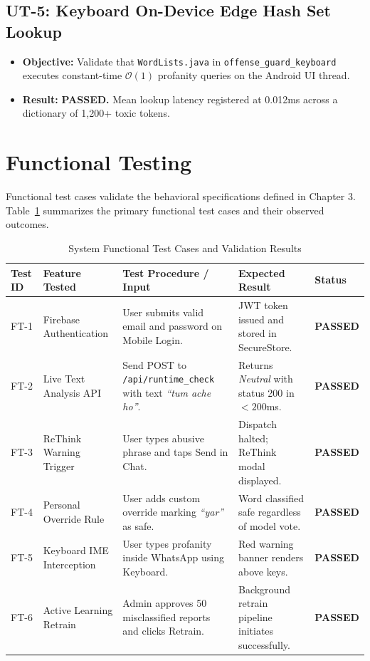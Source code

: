 \documentclass[A4paper,12pt]{report}
\theoremstyle{plain}
\theoremstyle{definition}
\theoremstyle{remark}
\numberwithin{equation}{section}
\begin{document}
\subsection{UT-5: Keyboard On-Device Edge Hash Set Lookup}
\begin{itemize}[leftmargin=*]
    \item \textbf{Objective:} Validate that \texttt{WordLists.java} in \texttt{offense\_guard\_keyboard} executes constant-time $\mathcal{O}(1)$ profanity queries on the Android UI thread.
    \item \textbf{Result:} \textbf{PASSED.} Mean lookup latency registered at 0.012ms across a dictionary of 1,200+ toxic tokens.
\end{itemize}

\section{Functional Testing}
Functional test cases validate the behavioral specifications defined in Chapter 3. Table~\ref{tab:functional_tests} summarizes the primary functional test cases and their observed outcomes.

\begin{table}[H]
\centering
\caption{System Functional Test Cases and Validation Results}
\label{tab:functional_tests}
\renewcommand{\arraystretch}{1.3}
\begin{tabular}{|p{2cm}|p{3.5cm}|p{4.5cm}|p{2cm}|p{2cm}|}
\hline
\textbf{Test ID} & \textbf{Feature Tested} & \textbf{Test Procedure / Input} & \textbf{Expected Result} & \textbf{Status} \\ \hline
FT-1 & Firebase Authentication & User submits valid email and password on Mobile Login. & JWT token issued and stored in SecureStore. & \textbf{PASSED} \\ \hline
FT-2 & Live Text Analysis API & Send POST to \texttt{/api/runtime\_check} with text \textit{``tum ache ho''}. & Returns \textit{Neutral} with status 200 in $<200$ms. & \textbf{PASSED} \\ \hline
FT-3 & ReThink Warning Trigger & User types abusive phrase and taps Send in Chat. & Dispatch halted; ReThink modal displayed. & \textbf{PASSED} \\ \hline
FT-4 & Personal Override Rule & User adds custom override marking \textit{``yar''} as safe. & Word classified safe regardless of model vote. & \textbf{PASSED} \\ \hline
FT-5 & Keyboard IME Interception & User types profanity inside WhatsApp using Keyboard. & Red warning banner renders above keys. & \textbf{PASSED} \\ \hline
FT-6 & Active Learning Retrain & Admin approves 50 misclassified reports and clicks Retrain. & Background retrain pipeline initiates successfully. & \textbf{PASSED} \\ \hline
\end{tabular}
\end{table}
\end{document}
